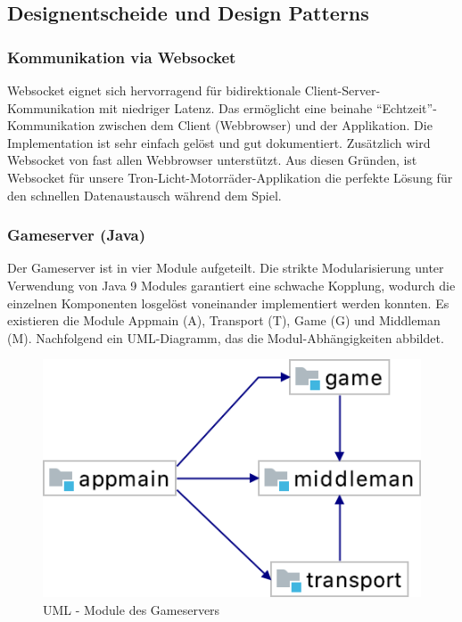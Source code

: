 \documentclass[11pt,ngerman]{article}
\newcommand{\quotes}[1]{``#1''}
\begin{document}
    \subsection{Designentscheide und Design Patterns} %

    \subsubsection{Kommunikation via Websocket}
    \Gls{Websocket} eignet  sich hervorragend für bidirektionale Client-Server-Kommunikation mit niedriger Latenz. Das ermöglicht eine beinahe  \quotes{Echtzeit}-Kommunikation zwischen dem Client (\Gls{Webbrowser}) und der Applikation. Die Implementation ist sehr einfach gelöst und gut dokumentiert. Zusätzlich wird \Gls{Websocket} von fast allen \Gls{Webbrowser} unterstützt. Aus diesen Gründen, ist \Gls{Websocket} für unsere Tron-Licht-Motorräder-Applikation die perfekte Lösung für den schnellen Datenaustausch während dem Spiel.

    \subsubsection{Gameserver  (Java)}
	Der Gameserver ist in vier Module aufgeteilt. Die strikte Modularisierung unter Verwendung von Java 9 Modules garantiert eine schwache Kopplung, wodurch die einzelnen Komponenten losgelöst voneinander implementiert werden konnten. Es existieren die Module Appmain (A), Transport (T), Game (G) und Middleman (M). Nachfolgend ein UML-Diagramm, das die Modul-Abhängigkeiten abbildet.

	\begin{figure}[H]
    	\centering
    	\includegraphics[scale=0.5]{figures/gameserver-uml/modules.png}
    	\caption{UML - Module des Gameservers}
    	\label{fig:UMLModule}
    \end{figure}
\end{document}
